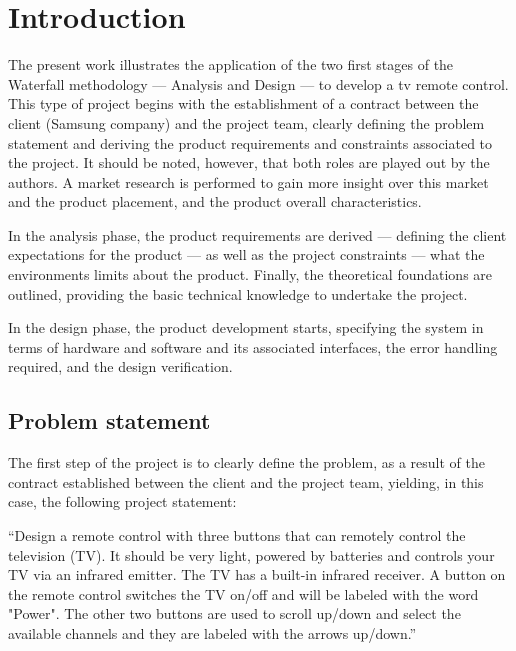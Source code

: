 %
%
%
\chapter{Introduction}%
\label{ch:introduction}
The present work illustrates the application of the two first stages of the Waterfall methodology
--- Analysis and Design --- to develop a \gls{tv} remote control. This type of project
begins with the establishment of a contract between the client (Samsung company)
and the project team, clearly defining the problem statement and deriving the
product requirements and constraints associated to the project. It should be
noted, however, that both roles are played out by the authors.
A market
research is performed to gain more insight over this market and the
product placement, and the product overall characteristics.

In the analysis
phase, the product requirements are derived --- defining the client expectations
for the product --- as well as the project constraints --- what the environments
limits about the product. Finally, the theoretical foundations are outlined,
providing the basic technical knowledge to undertake the project.

In the design phase, the product development starts, specifying the system in
terms of hardware and software and its associated interfaces, the error handling
required, and the design verification.
%
  \vspace{-5mm}
%  
\section{Problem statement}
\label{sec:prob-stat}
The first step of the project is to clearly define the problem, as a result of
the contract established between the client and the project team, yielding, in
this case, the following project statement:

``Design a remote control with three buttons that can
remotely control the television (TV). It should be very
light, powered by batteries and controls your TV via an
infrared emitter. The TV has a built-in infrared receiver. A
button on the remote control switches the TV on/off and
will be labeled with the word "Power". The other two
buttons are used to scroll up/down and select the available
channels and they are labeled with the arrows up/down.''
%
  \vspace{-5mm}
%  

